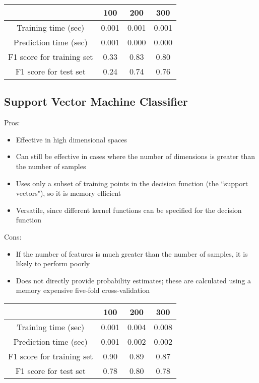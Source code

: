 \documentclass[12 pt]{article}
\numberwithin{equation}{section}
\begin{document}
\begin{center}
  \begin{tabular}{| c | c | c | c | }
    \hline
    & 100 & 200 & 300 \\ \hline
    Training time (sec) & 0.001 & 0.001 & 0.001 \\ \hline
    Prediction time (sec) & 0.001 & 0.000 & 0.000 \\ \hline 
    F1 score for training set & 0.33 & 0.83 & 0.80 \\ \hline
    F1 score for test set & 0.24 & 0.74 & 0.76\\ \hline
  \end{tabular}
\end{center}

\subsection{Support Vector Machine Classifier}
Pros:
\begin{itemize}
	\item Effective in high dimensional spaces
	\item Can still be effective in cases where the number of dimensions is greater than the number of samples
	\item Uses only a subset of training points in the decision function (the ``support vectors"), so it is memory efficient
	\item Versatile, since different kernel functions can be specified for the decision function
\end{itemize}
Cons:
\begin{itemize}
	\item If the number of features is much greater than the number of samples, it is likely to perform poorly
	\item Does not directly provide probability estimates; these are calculated using a memory expensive five-fold cross-validation
\end{itemize}

\begin{center}
  \begin{tabular}{| c | c | c | c | }
    \hline
    & 100 & 200 & 300 \\ \hline
    Training time (sec) & 0.001 & 0.004 & 0.008 \\ \hline
    Prediction time (sec) & 0.001 & 0.002 & 0.002 \\ \hline 
    F1 score for training set & 0.90 & 0.89 & 0.87 \\ \hline
    F1 score for test set & 0.78 & 0.80 & 0.78 \\ \hline
  \end{tabular}
\end{center}
\end{document}
